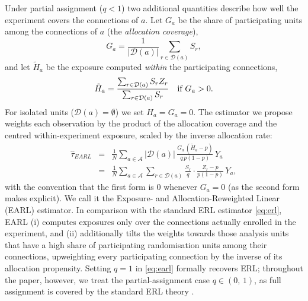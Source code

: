 \documentclass[sigconf,nonacm]{acmart}
\begin{document}
Under partial assignment ($q<1$) two additional quantities describe how well the experiment covers the connections of $a$. Let $G_a$ be the share of participating units among the connections of $a$ (the \emph{allocation coverage}),
\begin{equation}\label{eq:Ga}
    G_a = \frac{1}{|\mathcal{D}(a)|}\sum_{r\in\mathcal{D}(a)} S_r,
\end{equation}
and let $\tilde H_a$ be the exposure computed \emph{within} the participating connections,
\begin{equation}\label{eq:Hta}
    \tilde H_a = \frac{\sum_{r\in\mathcal{D}(a)} S_rZ_r}{\sum_{r\in\mathcal{D}(a)} S_r}\quad\textup{if } G_a>0.
\end{equation}
For isolated units ($\mathcal D(a)=\emptyset$) we set $H_a = G_a = 0$.
The estimator we propose weights each observation by the product of the allocation coverage and the centred within-experiment exposure, scaled by the inverse allocation rate:
\begin{eqnarray}\label{eq:earl}
    \hat \tau_{EARL} &=& \frac 1 N \sum_{a\in \mathcal A} |\mathcal D(a)|\,\frac{G_a\,(\tilde H_a - p)}{q\,p(1-p)}\, Y_a \nonumber\\
    &=& \frac 1 N \sum_{a\in \mathcal A} \sum_{r\in\mathcal{D}(a)}\frac{S_r}{q}\cdot\frac{Z_r - p}{p(1-p)}\, Y_a,
\end{eqnarray}
with the convention that the first form is $0$ whenever $G_a=0$ (as the second form makes explicit). We call it the Exposure- and Allocation-Reweighted Linear (EARL) estimator. In comparison with the standard ERL estimator \eqref{eq:erl}, EARL (i) computes exposures only over the connections actually enrolled in the experiment, and (ii) additionally tilts the weights towards those analysis units that have a high share of participating randomisation units among their connections, upweighting every participating connection by the inverse of its allocation propensity. Setting $q=1$ in \eqref{eq:earl} formally recovers ERL; throughout the paper, however, we treat the partial-assignment case $q\in(0,\,1)$, as full assignment is covered by the standard ERL theory \cite{harshaw2023erl}.
\end{document}
